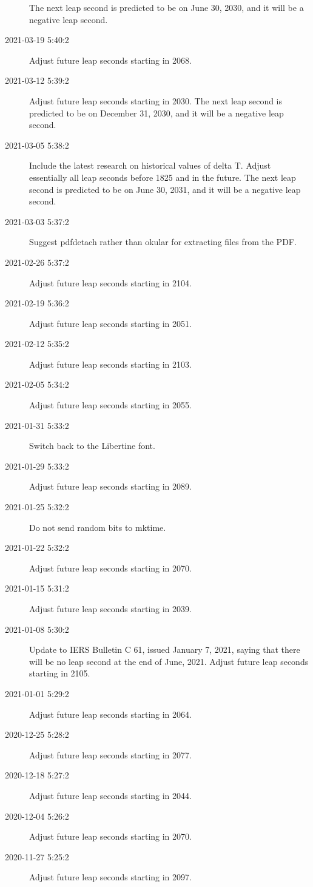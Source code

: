\documentclass[letterpaper,twoside]{article}
\begin{document}
\begin{description}
  The next leap second is predicted to be on June 30, 2030, and
  it will be a negative leap second.
\item[2021-03-19 5:40:2]Adjust future leap seconds starting in 2068.
\item[2021-03-12 5:39:2]Adjust future leap seconds starting in 2030.
  The next leap second is predicted to be on December 31, 2030,
  and it will be a negative leap second.
\item[2021-03-05 5:38:2]Include the latest research on historical values
  of delta T.  Adjust essentially all leap seconds before 1825 and
  in the future.  The next leap second is predicted to be on June 30, 2031,
  and it will be a negative leap second.
\item[2021-03-03 5:37:2]Suggest pdfdetach rather than okular
  for extracting files from the PDF.
\item[2021-02-26 5:37:2]Adjust future leap seconds starting in 2104.
\item[2021-02-19 5:36:2]Adjust future leap seconds starting in 2051.
\item[2021-02-12 5:35:2]Adjust future leap seconds starting in 2103.
\item[2021-02-05 5:34:2]Adjust future leap seconds starting in 2055.
\item[2021-01-31 5:33:2]Switch back to the Libertine font.
\item[2021-01-29 5:33:2]Adjust future leap seconds starting in 2089.
\item[2021-01-25 5:32:2]Do not send random bits to mktime.
\item[2021-01-22 5:32:2]Adjust future leap seconds starting in 2070.
\item[2021-01-15 5:31:2]Adjust future leap seconds starting in 2039.
\item[2021-01-08 5:30:2]Update to IERS Bulletin C 61, issued
  January 7, 2021, saying that there will be no leap second
  at the end of June, 2021.
  Adjust future leap seconds starting in 2105.
\item[2021-01-01 5:29:2]Adjust future leap seconds starting in 2064.
\item[2020-12-25 5:28:2]Adjust future leap seconds starting in 2077.
\item[2020-12-18 5:27:2]Adjust future leap seconds starting in 2044.
\item[2020-12-04 5:26:2]Adjust future leap seconds starting in 2070.
\item[2020-11-27 5:25:2]Adjust future leap seconds starting in 2097.

\end{description}
\end{document}
